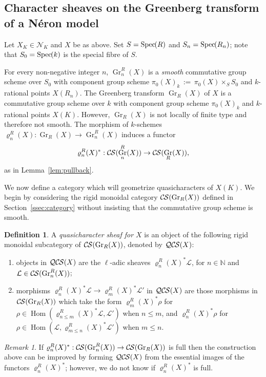 \documentclass[10pt]{amsart}
\theoremstyle{plain}
\theoremstyle{definition}
\newtheorem{definition}[theorem]{Definition}
\theoremstyle{remark}
\newtheorem{remark}[theorem]{Remark}
\newcommand{\NN}{{\mathbb{N}}}
\newcommand{\Fq}{k}
\DeclareMathOperator{\Hom}{Hom}
\DeclareMathOperator{\Gr}{Gr}
\newcommand{\Spec}[1]{{\operatorname{Spec}\hskip-1pt( #1 )}}
\newcommand{\ceq}{{\, :=\, }}
\newcommand{\cs}[1]{{\mathcal{#1}}}
\newcommand{\CS}{{\mathcal{C\hskip-0.8pt S}}}
\newcommand{\QCS}{{\mathcal{QC\hskip-0.8pt S}}}
\begin{document}
\subsection{Character sheaves on the Greenberg transform of a N\'eron model} \label{ssec:CS_on_GN}
 
Let $X_K \in \mathcal{N}_K$ and $X$ be as above.
Set $S = \Spec{R}$ and $S_n = \Spec{R_n}$;
note that $S_0 = \Spec{\Fq}$ is the special fibre of $S$.

For every non-negative integer $n$, $\Gr^R_n(X)$ is a {\it smooth} commutative group scheme over $S_0$
with component group scheme $\pi_0(X)_{\Fq} \ceq \pi_0(X) \times_S S_0$ and $\Fq$-rational points $X(R_n).$
%
The Greenberg transform $\Gr_R(X)$ of $X$ is a commutative group scheme over $\Fq$
with component group scheme $\pi_0(X)_{\Fq}$
and $\Fq$-rational points $X(K).$
However, $\Gr_R(X)$ is not locally of finite type and therefore not smooth.
%
The morphism of $\Fq$-schemes $\varrho^R_n(X) : \Gr_R(X) \to \Gr^R_n(X)$ induces a functor
\[
\varrho^R_n(X)^* : \CS(\Gr^R_n(X)) \to \CS(\Gr_R(X)),
\]
as in Lemma~\ref{lem:pullback}.

We now define a category which will geometrize quasicharacters of $X(K)$.
We begin by considering the rigid monoidal category $\CS(\Gr_R(X))$ defined in Section~\ref{ssec:category} without insisting that the commutative group scheme is smooth.

\begin{definition}
A {\it quasicharacter sheaf for $X$} is an object of
the following rigid monoidal subcategory of $\CS(\Gr_R(X))$, denoted by $\QCS(X)$:
\begin{enumerate}
\item
objects in $\QCS(X)$ are the $\ell$-adic sheaves $\varrho^R_n(X)^*\cs{L}$, for $n\in \NN$ and $\cs{L} \in \CS(\Gr^R_n(X))$; 
\item
morphisms $\varrho^R_n(X)^*\cs{L} \to \varrho^R_m(X)^*\cs{L}'$ in $\QCS(X)$ are those morphisms in $\CS(\Gr_R(X))$ which take the form $\varrho^R_m(X)^*\rho$ for $\rho \in \Hom(\varrho^R_{n\leq m}(X)^*\cs{L},\cs{L}')$ when $n\leq m$, and $\varrho^R_n(X)^*\rho$ for $\rho \in \Hom(\cs{L},\varrho^R_{m\leq n}(X)^*\cs{L}')$ when $m\leq n$.
\end{enumerate}

\end{definition}


\begin{remark}
If $\varrho^R_n(X)^* : \CS(\Gr^R_n(X)) \to \CS(\Gr_R(X))$ is full then the construction above can be improved by forming $\QCS(X)$ from the essential images of the functors $\varrho^R_n(X)^*$; however, we do not know if $\varrho^R_n(X)^*$ is full.
\end{remark}
\end{document}
